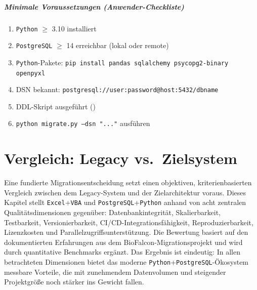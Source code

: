 \documentclass[12pt,a4paper]{report}
\theoremstyle{definition}
\theoremstyle{remark}
\newcommand{\excel}{\texttt{Excel}}
\newcommand{\vba}{\texttt{VBA}}
\newcommand{\pg}{\texttt{PostgreSQL}}
\newcommand{\py}{\texttt{Python}}
\newcommand{\code}[1]{\texttt{#1}}
\begin{document}
\paragraph{Minimale Voraussetzungen (Anwender-Checkliste)}
\begin{enumerate}[leftmargin=1.5em, topsep=2pt, itemsep=2pt]
  \item \py{} $\geq$ 3.10 installiert
  \item \pg{} $\geq$ 14 erreichbar (lokal oder remote)
  \item \py-Pakete: \code{pip install pandas sqlalchemy psycopg2-binary openpyxl}
  \item DSN bekannt: \code{postgresql://user:password@host:5432/dbname}
  \item DDL-Skript ausgeführt ()
  \item \code{python migrate.py --dsn "..."} ausführen
\end{enumerate}

\chapter{Vergleich: Legacy vs.\ Zielsystem}

Eine fundierte Migrationsentscheidung setzt einen objektiven, kriterienbasierten Vergleich zwischen dem Legacy-System und der Zielarchitektur voraus. Dieses Kapitel stellt \excel{}+\vba{} und \pg{}+\py{} anhand von acht zentralen Qualitätsdimensionen gegenüber: Datenbankintegrität, Skalierbarkeit, Testbarkeit, Versionierbarkeit, CI/CD-Integrationsfähigkeit, Reproduzierbarkeit, Lizenzkosten und Parallelzugriffsunterstützung. Die Bewertung basiert auf den dokumentierten Erfahrungen aus dem BioFalcon-Migrations\-projekt und wird durch quantitative Benchmarks ergänzt. Das Ergebnis ist eindeutig: In allen betrachteten Dimensionen bietet das moderne \py{}+\pg{}-Ökosystem messbare Vorteile, die mit zunehmendem Datenvolumen und steigender Projektgröße noch stärker ins Gewicht fallen.
\end{document}
